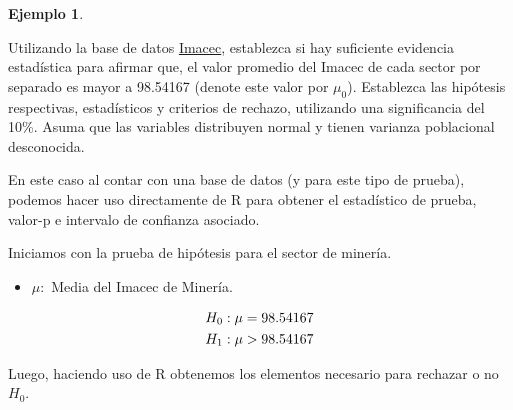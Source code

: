 \documentclass[
  11pt,
]{book}
\newenvironment{Shaded}{\begin{snugshade}}{\end{snugshade}}
\newcommand{\AttributeTok}[1]{\textcolor[rgb]{0.13,0.29,0.53}{#1}}
\newcommand{\CommentTok}[1]{\textcolor[rgb]{0.56,0.35,0.01}{\textit{#1}}}
\newcommand{\FloatTok}[1]{\textcolor[rgb]{0.00,0.00,0.81}{#1}}
\newcommand{\FunctionTok}[1]{\textcolor[rgb]{0.13,0.29,0.53}{\textbf{#1}}}
\newcommand{\NormalTok}[1]{#1}
\newcommand{\SpecialCharTok}[1]{\textcolor[rgb]{0.81,0.36,0.00}{\textbf{#1}}}
\newcommand{\StringTok}[1]{\textcolor[rgb]{0.31,0.60,0.02}{#1}}
\providecommand{\tightlist}{%
  \setlength{\itemsep}{0pt}\setlength{\parskip}{0pt}}
\theoremstyle{definition}
\theoremstyle{definition}
\newtheorem{example}{Ejemplo}[chapter]
\theoremstyle{definition}
\theoremstyle{definition}
\theoremstyle{remark}
\begin{document}
\begin{example}
\protect\hypertarget{exm:imacec}{}\label{exm:imacec}

Utilizando la base de datos \hyperref[Imacec2]{Imacec}, establezca si hay suficiente evidencia estadística para afirmar que, el valor promedio del Imacec de cada sector por separado es mayor a 98.54167 (denote este valor por \(\mu_0\)). Establezca las hipótesis respectivas, estadísticos y criterios de rechazo, utilizando una significancia del 10\%. Asuma que las variables distribuyen normal y tienen varianza poblacional desconocida.

En este caso al contar con una base de datos (y para este tipo de prueba), podemos hacer uso directamente de R para obtener el estadístico de prueba, valor-p e intervalo de confianza asociado.

Iniciamos con la prueba de hipótesis para el sector de minería.

\begin{itemize}
\tightlist
\item
  \(\mu:\) Media del Imacec de Minería.
\end{itemize}

\begin{equation}
    \notag
    \begin{split}
        H_0: \mu = 98.54167\\
        H_1: \mu > 98.54167
    \end{split}
\end{equation}

Luego, haciendo uso de R obtenemos los elementos necesario para rechazar o no \(H_0\).

\begin{Shaded}
\end{Shaded}


\end{example}
\end{document}
